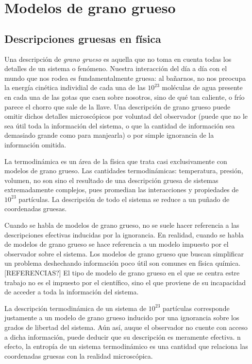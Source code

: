 \section{Modelos de grano grueso}\label{sec:Ch1CG}

\subsection{Descripciones gruesas en física}

Una descripción de \textit{grano grueso} es aquella que no toma en cuenta todas los detalles de un sistema o fenómeno. Nuestra interacción del día a día con el mundo que nos rodea es fundamentalmente gruesa: al bañarnos, no nos preocupa la energía cinética individial de cada una de las $10^{23}$ moléculas de agua presente en cada una de las gotas que caen sobre nosotros, sino de qué tan caliente, o frío parece el chorro que sale de la llave. Una descripción de grano grueso puede omitir dichos detalles microscópicos por voluntad del observador (puede que no le sea útil toda la información del sistema, o que la cantidad de información sea demasiado grande como para manjearla) o por simple ignorancia de la información omitida.

La termodinámica es un área de la física que trata casi exclusivamente con modelos de grano grueso. Las cantidades termodinámicas: temperatura, presión, volumen, no son sino el resultado de una descripción gruesa de sistemas extremadamente complejos, pues promedian las interacciones y propiedades de $10^{23}$ partículas. La descripción de todo el sistema se reduce a un puñado de coordenadas gruesas.

Cuando se habla de modelos de grano grueso, no se suele hacer referencia a las descripciones efectivas inducidas por la ignorancia. En realidad, cuando se habla de modelos de grano grueso se hace referencia a un modelo impuesto por el observador sobre el sistema. Los modelos de grano grueso que buscan simplificar un problema deshechando información poco útil son comunes en física química. [REFERENCIAS?] El tipo de modelo de grano grueso en el que se centra estre trabajo no es el impuesto por el científico, sino el que proviene de su incapacidad de acceder a toda la información del sistema.

La descripción termodinámica de un sistema de $10^{23}$ partículas corresponde justamente a un modelo de grano grueso inducido por una ignorancia sobre los grados de libertad del sistema. Aún así, auque el observador no cuente con acceso a dicha información, puede deducir que su descripción es meramente efectiva. n efecto, la entropía de un sistema termodinámico es una cantidad que relaciona las coordenadas gruesas con la realidad microscópica.

